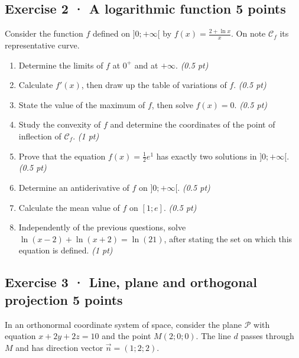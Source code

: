 \subsection*{Exercise 2 · A logarithmic function \hfill 5 points}Consider the function $f$ defined on $]0;+\infty[$ by $f(x)=\frac{2+\ln x}x$. On note $\mathcal C_f$ its representative curve.

\begin{enumerate}

\item Determine the limits of $f$ at $0^+$ and at $+\infty$. \hfill\textit{(0.5 pt)}

\item Calculate $f' (x)$, then draw up the table of variations of $f$. \hfill\textit{(0.5 pt)}

\item State the value of the maximum of $f$, then solve $f(x)=0$. \hfill\textit{(0.5 pt)}

\item Study the convexity of $f$ and determine the coordinates of the point of inflection of $\mathcal C_f$. \hfill\textit{(1 pt)}

\item Prove that the equation $f(x)=\frac12 e^{1}$ has exactly two solutions in $]0;+\infty[$. \hfill\textit{(0.5 pt)}

\item Determine an antiderivative of $f$ on $]0;+\infty[$. \hfill\textit{(0.5 pt)}

\item Calculate the mean value of $f$ on $[1;e]$. \hfill\textit{(0.5 pt)}

\item Independently of the previous questions, solve $\ln(x-2)+\ln(x+2)=\ln(21)$, after stating the set on which this equation is defined. \hfill\textit{(1 pt)}

\end{enumerate}

\clearpage{}\par

\subsection*{Exercise 3 · Line, plane and orthogonal projection \hfill 5 points}In an orthonormal coordinate system of space, consider the plane $\mathcal P$ with equation $x+2y+2z=10$ and the point $M(2;0;0)$. The line $d$ passes through $M$ and has direction vector $\vec n=(1;2;2)$.

